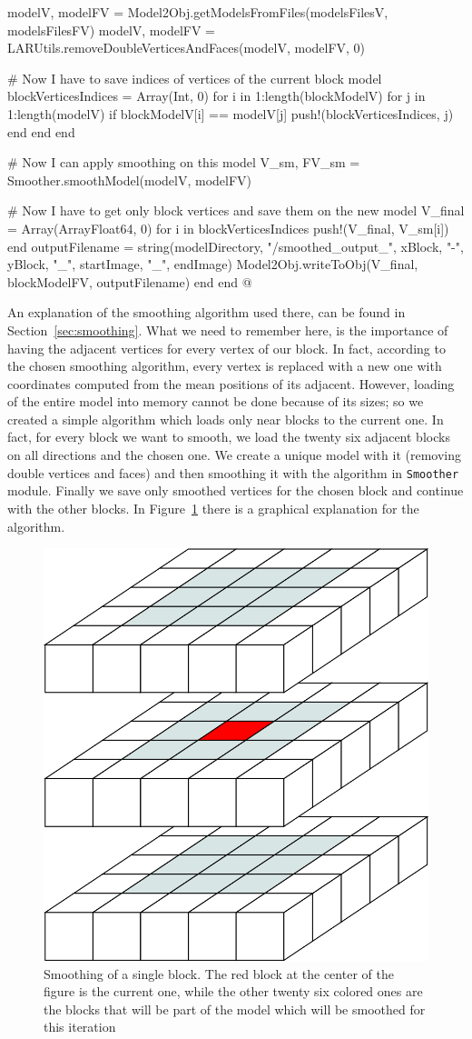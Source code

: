 \documentclass[11pt,oneside]{article}	%
\begin{document}
{    modelV, modelFV = Model2Obj.getModelsFromFiles(modelsFilesV, modelsFilesFV)
    modelV, modelFV = LARUtils.removeDoubleVerticesAndFaces(modelV, modelFV, 0)

    # Now I have to save indices of vertices of the current block model
    blockVerticesIndices = Array(Int, 0)
    for i in 1:length(blockModelV)
      for j in 1:length(modelV)
        if blockModelV[i] == modelV[j]
          push!(blockVerticesIndices, j)
        end
      end
    end

    # Now I can apply smoothing on this model
    V_sm, FV_sm = Smoother.smoothModel(modelV, modelFV)

    # Now I have to get only block vertices and save them on the new model
    V_final = Array(Array{Float64}, 0)
    for i in blockVerticesIndices
      push!(V_final, V_sm[i])
    end
    outputFilename = string(modelDirectory, "/smoothed_output_", xBlock, "-",
                            yBlock, "_", startImage, "_", endImage)
    Model2Obj.writeToObj(V_final, blockModelFV, outputFilename)
  end
end @}

An explanation of the smoothing algorithm used there, can be found in Section~\ref{sec:smoothing}. What we need to remember here, is the importance of having the adjacent vertices for every vertex of our block. In fact, according to the chosen smoothing algorithm, every vertex is replaced with a new one with coordinates computed from the mean positions of its adjacent. However, loading of the entire model into memory cannot be done because of its sizes; so we created a simple algorithm which loads only near blocks to the current one.
In fact, for every block we want to smooth, we load the twenty six adjacent blocks on all directions and the chosen one. We create a unique model with it (removing double vertices and faces) and then smoothing it with the algorithm in \texttt{Smoother} module. Finally we save only smoothed vertices for the chosen block and continue with the other blocks. In Figure~\ref{fig:SmoothingBlocks} there is a graphical explanation for the algorithm.

\begin{figure}[htb] %
   \centering
   \includegraphics[width=0.30\linewidth]{images/SmoothingBlocks.png}
   \caption{Smoothing of a single block. The red block at the center of the figure is the current one, while the other twenty six colored ones are the blocks that will be part of the model which will be smoothed for this iteration}
   \label{fig:SmoothingBlocks}
\end{figure}
\end{document}
